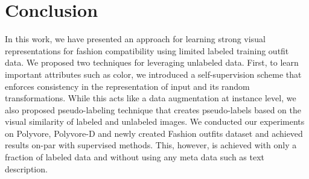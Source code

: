 \documentclass[sigconf]{acmart}
\begin{document}
\begin{comment}
\begin{table}[t]
    \centering
    \caption{Comparison of number of trainable model parameters. Lower the \#params, the better. Our model size is smaller and performs on par with fully supervised methods on the Polyvore}
    \vspace{1mm}
    \resizebox{0.98\columnwidth}{!}{
    \setlength{\tabcolsep}{3pt}
    \begin{tabular}{l|c|cc|c}
    \hline
        Method & $\alpha\%$ & FITB & Comp. & \#params  \\
        \hline
        
        CSN T1:1 + VSE \cite{csn} & {\color{red} 100\%} & \underline{54.5} & \underline{0.84} & 3.2M \\
        Type-Aware \cite{eccv2018learning} & {\color{red} 100\%} & 56.2 & \underline{0.86} & 3.2M \\ 
        Type-Aware \cite{eccv2018learning} (66 FCs) & {\color{red} 100\%} & 56.6 & \underline{0.86} &  3.5M \\ 
        SCE-Net (avg)  \cite{iccv2019learning} & {\color{red} 100\%} & 59.1 & 0.88 & 3.2M \\ 
        \hline
        \textit{Ours} & {\color{algoGreen} 5\%} & 54.9 & 0.86 & \textbf{2.8M} \\ 
        \hline
        
    \end{tabular}
    }
    \label{tab:params}
\end{table}
\end{comment}

 
\section{Conclusion}
In this work, we have presented an approach for learning strong visual representations for fashion compatibility using limited labeled training outfit data. We proposed two techniques for leveraging unlabeled data. First, to learn important attributes such as color, we introduced a self-supervision scheme that enforces consistency in the representation of input and its random transformations. While this acts like a data augmentation at instance level, we also proposed pseudo-labeling technique that creates pseudo-labels based on the visual similarity of labeled and unlabeled images. We conducted our experiments on Polyvore, Polyvore-D and newly created Fashion outfits dataset and achieved results on-par with supervised methods. This, however, is achieved with only a fraction of labeled data and without using any meta data such as text description. 


 
\end{document}
